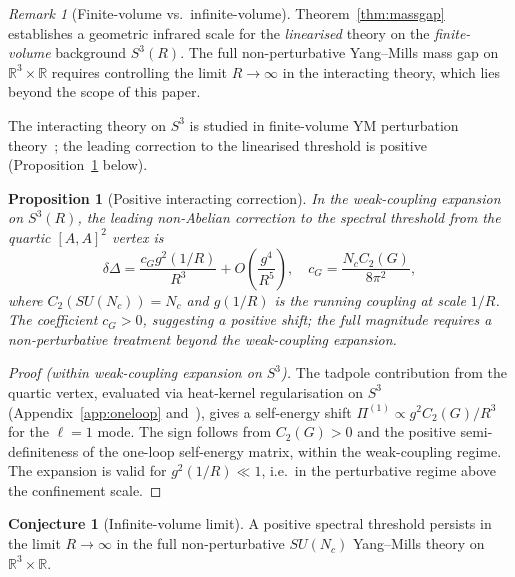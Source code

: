 \documentclass[
  aps,
  prd,
  reprint,
  superscriptaddress,
  nofootinbib,
  longbibliography,
  amsmath,
  amssymb
]{revtex4-2}
\theoremstyle{plain}
\newtheorem{proposition}[theorem]{Proposition}
\theoremstyle{definition}
\newtheorem{conjecture}{Conjecture}[section]
\theoremstyle{remark}
\newtheorem{remark}[theorem]{Remark}
\newcommand{\SU}[1]{SU(#1)}
\begin{document}
\begin{remark}[Finite-volume vs.\ infinite-volume]
  Theorem~\ref{thm:massgap} establishes a geometric infrared scale
  for the \emph{linearised} theory on the \emph{finite-volume}
  background $S^3(R)$. The full non-perturbative Yang--Mills mass gap
  on $\mathbb{R}^3\times\mathbb{R}$ requires controlling the limit
  $R\to\infty$ in the interacting theory, which lies beyond the scope
  of this paper.

  The interacting theory on $S^3$ is studied in finite-volume YM
  perturbation theory~\cite{Luscher1983}; the leading correction to
  the linearised threshold is positive (Proposition~\ref{prop:np} below).
\end{remark}

\begin{proposition}[Positive interacting correction]
  \label{prop:np}
  In the weak-coupling expansion on $S^3(R)$, the leading non-Abelian
  correction to the spectral threshold from the quartic $[A,A]^2$ vertex is
  \begin{equation}
    \delta\Delta = \frac{c_G g^2(1/R)}{R^3} + O\!\left(\frac{g^4}{R^5}\right),
    \quad c_G = \frac{N_c C_2(G)}{8\pi^2},
    \label{eq:correction}
  \end{equation}
  where $C_2(\SU{N_c})=N_c$ and $g(1/R)$ is the running coupling at
  scale $1/R$. The coefficient $c_G>0$, suggesting a positive shift; the full magnitude
  requires a non-perturbative treatment beyond the weak-coupling expansion.
\end{proposition}

\begin{proof}[Proof (within weak-coupling expansion on $S^3$)]
  The tadpole contribution from the quartic vertex, evaluated via
  heat-kernel regularisation on $S^3$ (Appendix~\ref{app:oneloop}
  and~\cite{Dowker1976}), gives a self-energy shift
  $\Pi^{(1)}\propto g^2 C_2(G)/R^3$ for the $\ell=1$ mode.
  The sign follows from $C_2(G)>0$ and the positive semi-definiteness
  of the one-loop self-energy matrix, within the weak-coupling regime.
  The expansion is valid for $g^2(1/R)\ll1$, i.e.\ in the
  perturbative regime above the confinement scale.
\end{proof}

\begin{conjecture}[Infinite-volume limit]
  \label{conj:infinite}
  A positive spectral threshold persists in the limit
  $R\to\infty$ in the full non-perturbative $\SU{N_c}$ Yang--Mills
  theory on $\mathbb{R}^3\times\mathbb{R}$.
\end{conjecture}
\end{document}
